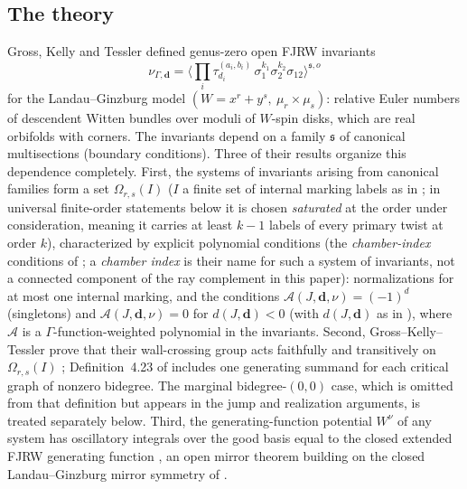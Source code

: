 \documentclass[11pt]{amsart}
\theoremstyle{definition}
\theoremstyle{remark}
\newcommand{\Ascr}{\mathcal{A}}
\newcommand{\Om}{\Omega_{r,s}}
\begin{document}
\subsection{The theory}
Gross, Kelly and Tessler \cite{GKT} defined genus-zero open FJRW invariants
\[
\nu_{\Gamma,\mathbf d}
=\Big\langle\prod_{i}\tau_{d_{i}}^{(a_{i},b_{i})}\,
\sigma_{1}^{k_{1}}\sigma_{2}^{k_{2}}\sigma_{12}\Big\rangle^{\mathfrak s,o}
\]
for the Landau--Ginzburg model $(W=x^{r}+y^{s},\ \mu_{r}\times\mu_{s})$: relative
Euler numbers of descendent Witten bundles over moduli of $W$-spin disks, which are
real orbifolds with corners. The invariants depend on a family $\mathfrak s$
of canonical multisections (boundary conditions). Three of their results organize this
dependence completely. First, the systems of invariants arising from canonical
families form a set $\Om(I)$ ($I$ a finite set of internal marking labels as
in \cite{GKT}; in universal finite-order statements below it is chosen
\emph{saturated} at the order under consideration, meaning it carries at least
$k-1$ labels of every primary twist at order $k$), characterized by explicit polynomial
conditions (the \emph{chamber-index} conditions of \cite[Def.~3.47,
Cor.~5.14]{GKT}; a \emph{chamber index} is their name for such a system of
invariants, not a connected component of the ray complement in this paper):
normalizations for at most one internal marking, and the conditions
$\Ascr(J,\mathbf d,\nu)=(-1)^{d}$ (singletons) and $\Ascr(J,\mathbf d,\nu)=0$ for
$d(J,\mathbf d)<0$ (with $d(J,\mathbf d)$ as in \cite[Def.~4.8]{GKT}), where
$\Ascr$ is a $\Gamma$-function-weighted polynomial in the invariants. Second,
Gross--Kelly--Tessler prove that their wall-crossing group acts faithfully and
transitively on $\Om(I)$ \cite[Thm.~4.27]{GKT}; Definition~4.23 of \cite{GKT}
includes one generating summand for each critical graph of nonzero bidegree.
The marginal bidegree-$(0,0)$ case, which is omitted from that definition but
appears in the jump and realization arguments, is treated separately below.
Third, the
generating-function potential $W^{\nu}$ of any system has oscillatory integrals
over the good basis equal to the closed extended FJRW generating function
\cite[Thm.~0.3]{GKT}, an open mirror theorem building on the closed
Landau--Ginzburg mirror symmetry of \cite{LLSS,HLSW}.
\end{document}
